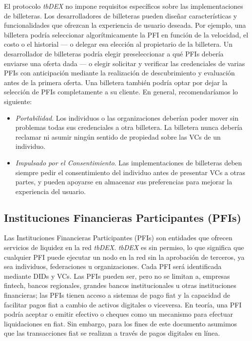 \documentclass[11pt]{article}
\begin{document}
\vspace{1\baselineskip}
El protocolo \textit{tbDEX} no impone requisitos específicos sobre las implementaciones de billeteras. Los desarrolladores de billeteras pueden diseñar características y funcionalidades que ofrezcan la experiencia de usuario deseada. Por ejemplo, una billetera podría seleccionar algorítmicamente la PFI en función de la velocidad, el costo o el historial — o delegar esa elección al propietario de la billetera. Un desarrollador de billeteras podría elegir preseleccionar a qué PFIs debería enviarse una oferta dada — o elegir solicitar y verificar las credenciales de varias PFIs con anticipación mediante la realización de descubrimiento y evaluación antes de la primera oferta. Una billetera también podría optar por dejar la selección de PFIs completamente a su cliente. En general, recomendaríamos lo siguiente:

\begin{itemize}
	\item \textit{Portabilidad}. Los individuos o las organizaciones deberían poder mover sin problemas todas sus credenciales a otra billetera. La billetera nunca debería reclamar ni asumir ningún sentido de propiedad sobre las VCs de un individuo.

	\item \textit{Impulsado por el Consentimiento}. Las implementaciones de billeteras deben siempre pedir el consentimiento del individuo antes de presentar VCs a otras partes, y pueden apoyarse en almacenar sus preferencias para mejorar la experiencia del usuario.

\end{itemize}
\subsection{Instituciones Financieras Participantes (PFIs)}

\vspace{1\baselineskip}
Las Instituciones Financieras Participantes (PFIs) son entidades que ofrecen servicios de liquidez en la red \textit{tbDEX}. \textit{tbDEX} es sin permiso, lo que significa que cualquier PFI puede ejecutar un nodo en la red sin la aprobación de terceros, ya sea individuos, federaciones u organizaciones. Cada PFI será identificada mediante DIDs y VCs. Las PFIs pueden ser, pero no se limitan a, empresas fintech, bancos regionales, grandes bancos institucionales u otras instituciones financieras; las PFIs tienen acceso a sistemas de pago fiat y la capacidad de facilitar pagos fiat a cambio de activos digitales o viceversa. En teoría, una PFI podría aceptar o emitir efectivo o cheques como un mecanismo para efectuar liquidaciones en fiat. Sin embargo, para los fines de este documento asumimos que las transacciones fiat se realizan a través de pagos digitales en línea.
\end{document}
